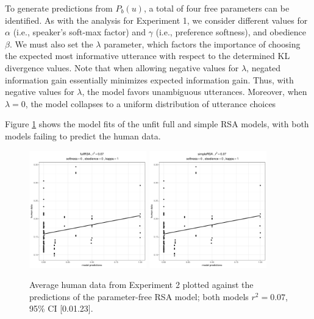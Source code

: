 \documentclass[10pt,a4paper]{article}
\newcommand{\gcs}[1]{\textcolor{blue}{[gcs: #1]}}
\begin{document}
To generate predictions from $P_b(u)$, a total of four free parameters can be identified. 
As with the analysis for Experiment 1, we consider different values for $\alpha$ (i.e., speaker's soft-max factor) and $\gamma$ (i.e., preference softness), and obedience $\beta$. 
We must also set the $\lambda$ parameter, which factors the importance of choosing the expected most informative utterance with respect to the determined KL divergence values.
Note that when allowing negative values for $\lambda$, negated information gain essentially minimizes expected information gain.
Thus, with negative values for $\lambda$, the model favors unambiguous utterances. 
Moreover, when $\lambda=0$, the model collapses to a uniform distribution of utterance choices 



Figure \ref{simple-full-x3} shows the model fits of the unfit full and simple RSA models, with both models failing to predict the human data.


\begin{figure}[ht]
	\centering
	\includegraphics[width=2in]{images/x3_m1.pdf}
	\includegraphics[width=2in]{images/x3_m7.pdf}
	\caption{Average human data from Experiment 2 plotted against the predictions of the parameter-free RSA model; both models $r^{2}=0.07$, 95\% CI [0.01.23].}\label{simple-full-x3}
\end{figure}
\end{document}
